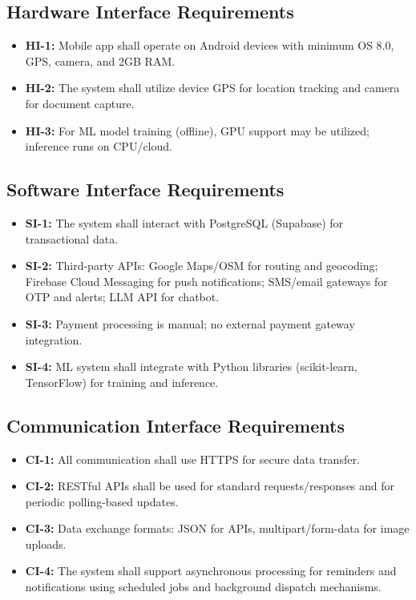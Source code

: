\subsection{Hardware Interface Requirements}
\begin{itemize}
\item \textbf{HI-1:} Mobile app shall operate on Android devices with minimum OS 8.0, GPS, camera, and 2GB RAM.
\item \textbf{HI-2:} The system shall utilize device GPS for location tracking and camera for document capture.
\item \textbf{HI-3:} For ML model training (offline), GPU support may be utilized; inference runs on CPU/cloud.
\end{itemize}

\subsection{Software Interface Requirements}
\begin{itemize}
\item \textbf{SI-1:} The system shall interact with PostgreSQL (Supabase) for transactional data.
\item \textbf{SI-2:} Third-party APIs: Google Maps/OSM for routing and geocoding; Firebase Cloud Messaging for push notifications; SMS/email gateways for OTP and alerts; LLM API for chatbot.
\item \textbf{SI-3:} Payment processing is manual; no external payment gateway integration.
\item \textbf{SI-4:} ML system shall integrate with Python libraries (scikit-learn, TensorFlow) for training and inference.
\end{itemize}

\subsection{Communication Interface Requirements}
\begin{itemize}
\item \textbf{CI-1:} All communication shall use HTTPS for secure data transfer.
\item \textbf{CI-2:} RESTful APIs shall be used for standard requests/responses and for periodic polling-based updates.
\item \textbf{CI-3:} Data exchange formats: JSON for APIs, multipart/form-data for image uploads.
\item \textbf{CI-4:} The system shall support asynchronous processing for reminders and notifications using scheduled jobs and background dispatch mechanisms.
\end{itemize}

